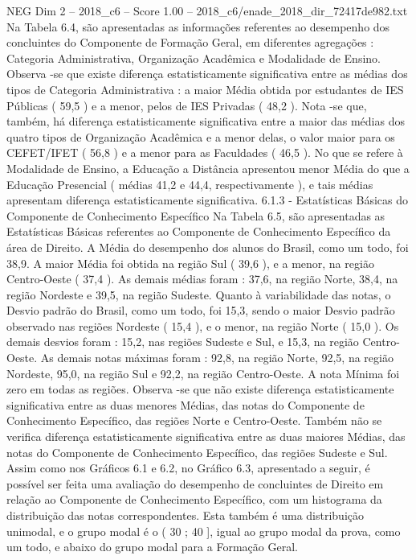 \begin{textsample}{NEG Dim 2 – 2018\_c6 – Score 1.00 – 2018\_c6/enade\_2018\_dir\_72417de982.txt}
Na Tabela 6.4, são apresentadas as informações referentes ao desempenho dos concluintes do Componente de Formação Geral, em diferentes agregações : Categoria Administrativa, Organização Acadêmica e Modalidade de Ensino.
Observa -se que existe diferença estatisticamente significativa entre as médias dos tipos de Categoria Administrativa : a maior Média obtida por estudantes de IES Públicas ( 59,5 ) e a menor, pelos de IES Privadas ( 48,2 ).
Nota -se que, também, há diferença estatisticamente significativa entre a maior das médias dos quatro tipos de Organização Acadêmica e a menor delas, o valor maior para os CEFET/IFET ( 56,8 ) e a menor para as Faculdades ( 46,5 ).
No que se refere à Modalidade de Ensino, a Educação a Distância apresentou menor Média do que a Educação Presencial ( médias 41,2 e 44,4, respectivamente ), e tais médias apresentam diferença estatisticamente significativa. 6.1.3 - Estatísticas Básicas do Componente de Conhecimento Específico Na Tabela 6.5, são apresentadas as Estatísticas Básicas referentes ao Componente de Conhecimento Específico da área de Direito.
A Média do desempenho dos alunos do Brasil, como um todo, foi 38,9.
A maior Média foi obtida na região Sul ( 39,6 ), e a menor, na região Centro-Oeste ( 37,4 ).
As demais médias foram : 37,6, na região Norte, 38,4, na região Nordeste e 39,5, na região Sudeste.
Quanto à variabilidade das notas, o Desvio padrão do Brasil, como um todo, foi 15,3, sendo o maior Desvio padrão observado nas regiões Nordeste ( 15,4 ), e o menor, na região Norte ( 15,0 ).
Os demais desvios foram : 15,2, nas regiões Sudeste e Sul, e 15,3, na região Centro-Oeste.
As demais notas máximas foram : 92,8, na região Norte, 92,5, na região Nordeste, 95,0, na região Sul e 92,2, na região Centro-Oeste.
A nota Mínima foi zero em todas as regiões.
Observa -se que não existe diferença estatisticamente significativa entre as duas menores Médias, das notas do Componente de Conhecimento Específico, das regiões Norte e Centro-Oeste.
Também não se verifica diferença estatisticamente significativa entre as duas maiores Médias, das notas do Componente de Conhecimento Específico, das regiões Sudeste e Sul.
Assim como nos Gráficos 6.1 e 6.2, no Gráfico 6.3, apresentado a seguir, é possível ser feita uma avaliação do desempenho de concluintes de Direito em relação ao Componente de Conhecimento Específico, com um histograma da distribuição das notas correspondentes.
Esta também é uma distribuição unimodal, e o grupo modal é o ( 30 ; 40 ], igual ao grupo modal da prova, como um todo, e abaixo do grupo modal para a Formação Geral.

\end{textsample}
